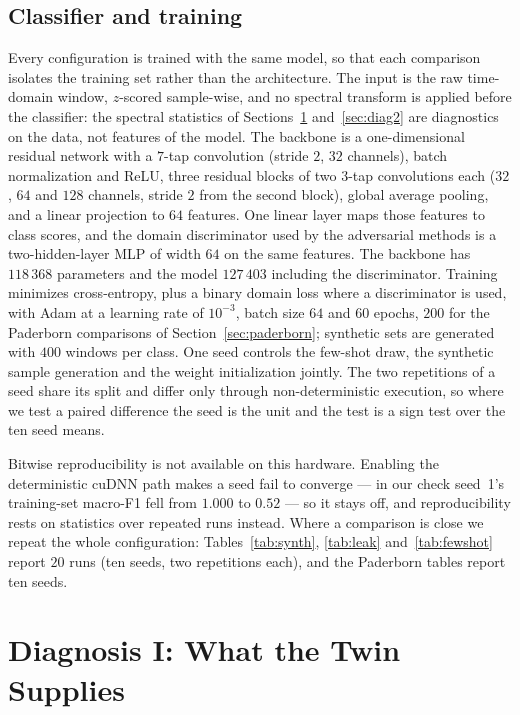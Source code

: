 \documentclass[journal]{IEEEtran}
\begin{document}
\subsection{Classifier and training}
\label{sec:classifier}
Every configuration is trained with the same model, so that each comparison
isolates the training set rather than the architecture. The input is the raw
time-domain window, $z$-scored sample-wise, and no spectral transform is applied
before the classifier: the spectral statistics of
Sections~\ref{sec:diag1} and~\ref{sec:diag2} are diagnostics on the data, not
features of the model. The backbone is a one-dimensional residual network with a
$7$-tap convolution (stride $2$, $32$ channels), batch normalization and ReLU,
three residual blocks of two $3$-tap convolutions each ($32$, $64$ and $128$
channels, stride $2$ from the second block), global average pooling, and a
linear projection to $64$ features. One linear layer maps those features to
class scores, and the domain discriminator used by the adversarial methods is a
two-hidden-layer MLP of width $64$ on the same features. The backbone has
$118\,368$ parameters and the model $127\,403$ including the discriminator.
Training minimizes cross-entropy, plus a binary domain loss where a
discriminator is used, with Adam at a learning rate of $10^{-3}$, batch size
$64$ and $60$ epochs, $200$ for the Paderborn comparisons of
Section~\ref{sec:paderborn}; synthetic sets are generated with $400$ windows per
class. One seed controls the few-shot draw, the synthetic sample generation and
the weight initialization jointly. The two repetitions of a seed share
its split and differ only through non-deterministic execution, so where
we test a paired difference the seed is the unit and the test is a sign
test over the ten seed means.

Bitwise reproducibility is not available on this hardware. Enabling the
deterministic cuDNN path makes a seed fail to converge --- in our check seed~1's
training-set macro-F1 fell from $1.000$ to $0.52$ --- so it stays off, and
reproducibility rests on statistics over repeated runs instead. Where a
comparison is close we repeat the whole configuration:
Tables~\ref{tab:synth}, \ref{tab:leak} and~\ref{tab:fewshot} report $20$ runs
(ten seeds, two repetitions each), and the Paderborn tables report ten seeds.

\section{Diagnosis I: What the Twin Supplies}
\label{sec:diag1}
\end{document}
